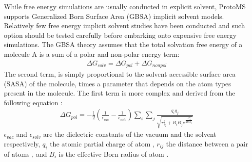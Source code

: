 \documentclass[letterpaper,10pt,english]{sphinxmanual}
\begin{document}
While free energy simulations are usually conducted in explicit solvent, ProtoMS supports Generalized Born Surface Area (GBSA) implicit solvent models. Relatively few free energy implicit solvent studies have been conducted and such option should be tested carefully before embarking onto expensive free energy simulations. The GBSA theory assumes that the total solvation free energy of a molecule A is a sum of a polar and non-polar energy term:
\begin{equation}\label{equation:protoms:gb1}
\begin{split}\Delta G_{solv} = \Delta G_{pol} + \Delta G_{nonpol}\end{split}
\end{equation}
The second term, is simply proportional to the solvent accessible surface area (SASA) of the molecule, times a parameter that depends on the atom types present in the molecule. The first term is more complex and derived from the following equation :
\begin{equation}\label{equation:protoms:gb2}
\begin{split}\Delta G_{pol} = -\frac{1}{2}(\frac{1}{\epsilon_{vac}}-\frac{1}{\epsilon_{solv}})  \sum_{i}\sum_{j} \frac{q_{i}q_{j}}{\sqrt{r^{2}_{ij} + B_{i}B_{j} e^{\frac{-r^{2}_{ij}}{4B_{i}B_{j}}}   } }\end{split}
\end{equation}
\(\epsilon_{vac}\) and \(\epsilon_{solv}\) are the dielectric constants of the vacuum and the solvent respectively, \(q_{i}\) the atomic partial charge of atom , \(r_{ij}\) the distance between a pair of atoms , and \(B_{i}\) is the effective Born radius of atom .
\end{document}
